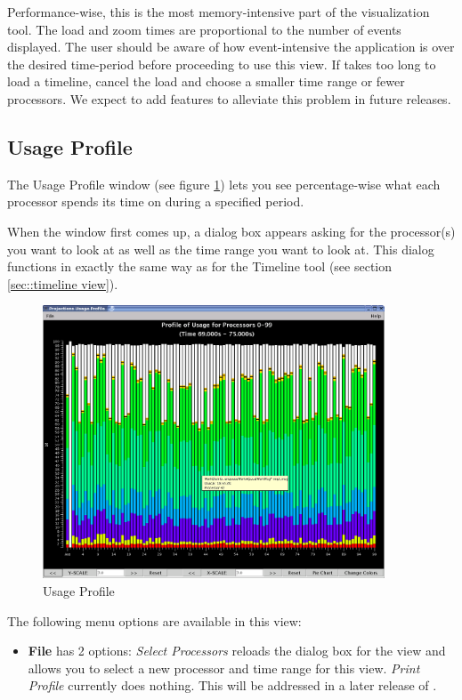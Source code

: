 \documentclass[10pt]{report}
\begin{document}
Performance-wise, this is the most memory-intensive part of the
visualization tool. The load and zoom times are proportional to the
number of events displayed. The user should be aware of how event-intensive the application is
over the desired time-period before proceeding to use this view. If
\projections{} takes too long to load a timeline, cancel the load and
choose a smaller time range or fewer processors. We expect to add features to alleviate
this problem in future releases.

\subsection{Usage Profile}
\label{sec::usage profile}
The Usage Profile window (see figure \ref{usage profile}) lets you see
percentage-wise what each processor spends its time on during a
specified period.

When the window first comes up, a dialog box appears asking for the
processor(s) you want to look at as well as the time range you want to
look at.  This dialog functions in exactly the same way as for the Timeline
tool (see section \ref{sec::timeline view}).

\begin{figure}[htb]
\center
\includegraphics[width=4.0in]{fig/usageprofile}
\caption{Usage Profile}
\label{usage profile}
\end{figure}

The following menu options are available in this view:

\begin{itemize}
\item {\bf File} has 2 options: {\it Select Processors} reloads the dialog
box for the view and allows you to select a new processor and time range
for this view. {\it Print Profile} currently does nothing. This will be
addressed in a later release of \projections{}.
\end{itemize}
\end{document}
